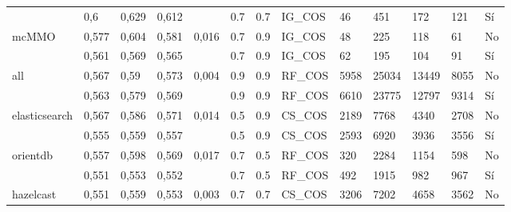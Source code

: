 \begin{table}[H]
{\begin{tabular}{lllllllllllll}
             & 0,6                & 0,629           & 0,612             &                    & 0.7           & 0.7        & IG\_COS                 & 46          & 451         & 172         & 121         & Sí                \\
mcMMO                          & 0,577              & 0,604           & 0,581             & 0,016              & 0.7           & 0.9        & IG\_COS                 & 48          & 225         & 118         & 61          & No               \\
                          & 0,561              & 0,569           & 0,565             &                    & 0.7           & 0.9        & IG\_COS                 & 62          & 195         & 104         & 91          & Sí                \\
all                            & 0,567              & 0,59            & 0,573             & 0,004              & 0.9           & 0.9        & RF\_COS                 & 5958        & 25034       & 13449       & 8055        & No               \\
                            & 0,563              & 0,579           & 0,569             &                    & 0.9           & 0.9        & RF\_COS                 & 6610        & 23775       & 12797       & 9314        & Sí                \\
elasticsearch                  & 0,567              & 0,586           & 0,571             & 0,014              & 0.5           & 0.9        & CS\_COS                 & 2189        & 7768        & 4340        & 2708        & No               \\
                  & 0,555              & 0,559           & 0,557             &                    & 0.5           & 0.9        & CS\_COS                 & 2593        & 6920        & 3936        & 3556        & Sí                \\
orientdb                       & 0,557              & 0,598           & 0,569             & 0,017              & 0.7           & 0.5        & RF\_COS                 & 320         & 2284        & 1154        & 598         & No               \\
                       & 0,551              & 0,553           & 0,552             &                    & 0.7           & 0.5        & RF\_COS                 & 492         & 1915        & 982         & 967         & Sí                \\
hazelcast                      & 0,551              & 0,559           & 0,553             & 0,003              & 0.7           & 0.7        & CS\_COS                 & 3206        & 7202        & 4658        & 3562        & No               \\

\end{tabular}}
\end{table}
